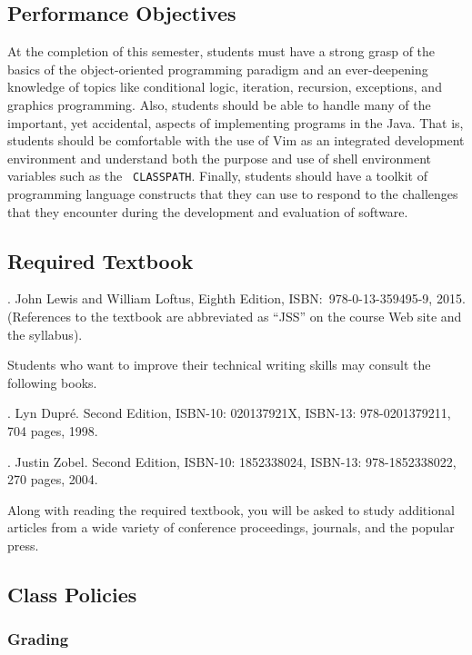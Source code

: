 \subsection*{Performance Objectives}

At the completion of this semester, students must have a strong grasp of the basics of the object-oriented programming
paradigm and an ever-deepening knowledge of topics like conditional logic, iteration, recursion, exceptions, and
graphics programming.  Also, students should be able to handle many of the important, yet accidental, aspects of
implementing programs in the Java.  That is, students should be comfortable with the use of Vim as an integrated
development environment and understand both the purpose and use of shell environment variables such as the {\tt
CLASSPATH}.  Finally, students should have a toolkit of programming language constructs that they can use to respond to
the challenges that they encounter during the development and evaluation of software.

\subsection*{Required Textbook}

. John Lewis and William Loftus, 
Eighth Edition, ISBN:\ 978-0-13-359495-9, 2015. \\
(References to the textbook are abbreviated as ``JSS'' on the course Web site and the syllabus).

\noindent
Students who want to improve their technical writing skills may consult the following books.

. Lyn Dupr\'e. Second Edition,  ISBN-10: 020137921X,
ISBN-13: 978-0201379211, 704 pages, 1998.

.  Justin Zobel. Second Edition,  ISBN-10: 1852338024, ISBN-13:
978-1852338022, 270 pages, 2004.

\noindent
Along with reading the required textbook, you will be asked to study additional articles from a wide variety of
conference proceedings, journals, and the popular press.

\subsection*{Class Policies}

\subsubsection*{Grading}

